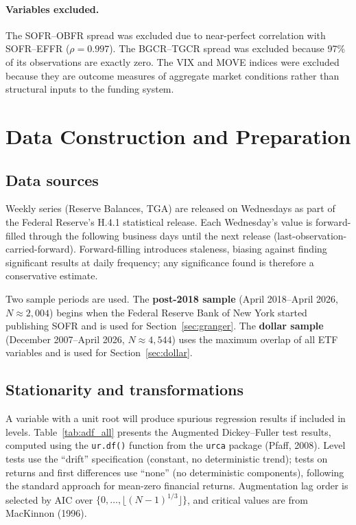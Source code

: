 \documentclass[12pt,a4paper]{article}
\begin{document}
\paragraph{Variables excluded.} The SOFR--OBFR spread was excluded due to near-perfect correlation with SOFR--EFFR ($\rho = 0.997$). The BGCR--TGCR spread was excluded because 97\% of its observations are exactly zero. The VIX and MOVE indices were excluded because they are outcome measures of aggregate market conditions rather than structural inputs to the funding system.


\section{Data Construction and Preparation}

\subsection{Data sources}



Weekly series (Reserve Balances, TGA) are released on Wednesdays as part of the Federal Reserve's H.4.1 statistical release. Each Wednesday's value is forward-filled through the following business days until the next release (last-observation-carried-forward). Forward-filling introduces staleness, biasing against finding significant results at daily frequency; any significance found is therefore a conservative estimate.

Two sample periods are used. The \textbf{post-2018 sample} (April 2018--April 2026, $N \approx 2{,}004$) begins when the Federal Reserve Bank of New York started publishing SOFR and is used for Section~\ref{sec:granger}. The \textbf{dollar sample} (December 2007--April 2026, $N \approx 4{,}544$) uses the maximum overlap of all ETF variables and is used for Section~\ref{sec:dollar}.

\subsection{Stationarity and transformations}

A variable with a unit root will produce spurious regression results if included in levels. Table~\ref{tab:adf_all} presents the Augmented Dickey--Fuller test results, computed using the \texttt{ur.df()} function from the \texttt{urca} package (Pfaff, 2008). Level tests use the ``drift'' specification (constant, no deterministic trend); tests on returns and first differences use ``none'' (no deterministic components), following the standard approach for mean-zero financial returns. Augmentation lag order is selected by AIC over $\{0, \ldots, \lfloor(N{-}1)^{1/3}\rfloor\}$, and critical values are from MacKinnon (1996).
\end{document}
